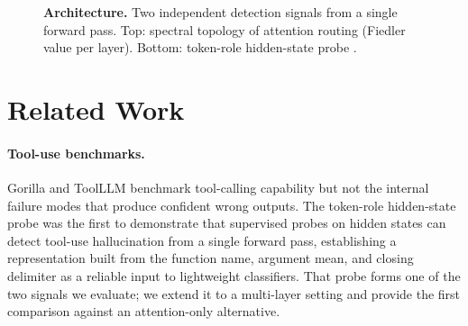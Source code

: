 \documentclass{article}
\begin{document}
\begin{figure}[t]
    \caption{\textbf{Architecture.}
      Two independent detection signals from a single forward pass.
      Top: spectral topology of attention routing (Fiedler value per layer).
      Bottom: token-role hidden-state probe \cite{healy2026internal}.}
    \label{fig:architecture}
\end{figure}


\section{Related Work}
\label{sec:related}

\paragraph{Tool-use benchmarks.}
Gorilla \cite{patil2024gorilla} and ToolLLM \cite{qin2023toolllm}
benchmark tool-calling capability but not the internal failure modes
that produce confident wrong outputs.  The token-role hidden-state
probe \cite{healy2026internal} was the first to demonstrate that
supervised probes on hidden states can detect tool-use hallucination
from a single forward pass, establishing a representation built from the
function name, argument mean, and closing delimiter as a reliable input
to lightweight classifiers.  That probe forms one of the two signals
we evaluate; we extend it to a multi-layer setting and provide the
first comparison against an attention-only alternative.
\end{document}
